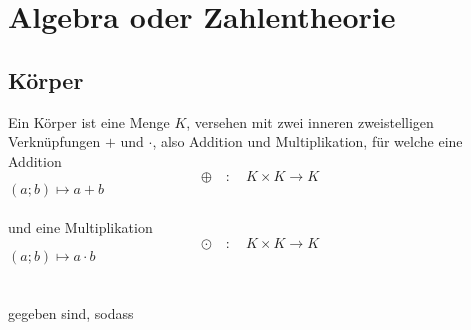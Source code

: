 \chapter{Algebra oder Zahlentheorie}

	\section{Körper}

Ein Körper ist eine Menge $K$, versehen mit zwei inneren zweistelligen Verknüpfungen $+$ und $\cdot$, also Addition und Multiplikation, für welche eine Addition
$$\oplus\quad : \quad K \times K \rightarrow K$$
$(a;b) \longmapsto a+b $\\\\
und eine Multiplikation
$$\odot \quad : \quad K \times K \rightarrow K$$
$(a;b) \longmapsto a \cdot b $\\\\\\
gegeben sind, sodass\\

\\\\\\

